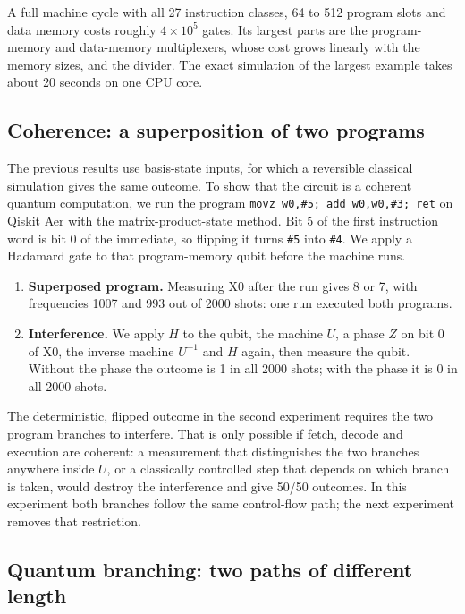 \documentclass[11pt]{article}
\begin{document}
A full machine cycle with all 27 instruction classes, 64 to 512 program slots and data memory
costs roughly $4\times10^{5}$ gates. Its largest parts are the program-memory and data-memory
multiplexers, whose cost grows linearly with the memory sizes, and the divider. The exact
simulation of the largest example takes about 20 seconds on one CPU core.

\subsection{Coherence: a superposition of two programs}
\label{sec:coherence}

The previous results use basis-state inputs, for which a reversible classical simulation
gives the same outcome. To show that the circuit is a coherent quantum computation, we
run the program \texttt{movz w0,\#5; add w0,w0,\#3; ret} on Qiskit Aer with the
matrix-product-state method. Bit 5 of the first instruction word is bit 0 of the immediate,
so flipping it turns \texttt{\#5} into \texttt{\#4}. We apply a Hadamard gate to that
program-memory qubit before the machine runs.

\begin{enumerate}
  \item \textbf{Superposed program.} Measuring X0 after the run gives 8 or 7, with frequencies
        1007 and 993 out of 2000 shots: one run executed both programs.
  \item \textbf{Interference.} We apply $H$ to the qubit, the machine $U$, a phase $Z$ on bit 0
        of X0, the inverse machine $U^{-1}$ and $H$ again, then measure the qubit. Without the
        phase the outcome is 1 in all 2000 shots; with the phase it is 0 in all 2000 shots.
\end{enumerate}

The deterministic, flipped outcome in the second experiment requires the two program branches to
interfere. That is only possible if fetch, decode and execution are coherent: a measurement that
distinguishes the two branches anywhere inside $U$, or a classically controlled step that depends
on which branch is taken, would destroy the interference and give 50/50 outcomes. In this experiment both branches follow the same control-flow path; the next experiment
removes that restriction.

\subsection{Quantum branching: two paths of different length}
\label{sec:branching}
\end{document}

